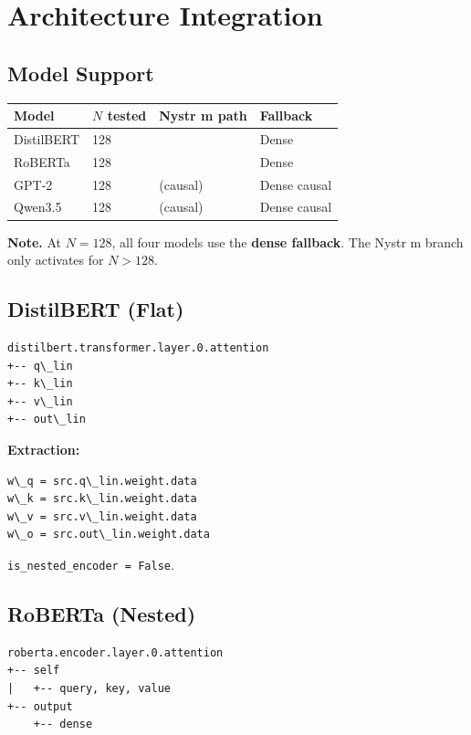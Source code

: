 
\section{Architecture Integration}

\subsection{Model Support}

\begin{table}[H]
\centering
\small
\begin{tabular}{llll}
\toprule
\textbf{Model} & \textbf{$N$ tested} & \textbf{Nystr m path} & \textbf{Fallback} \\
\midrule
DistilBERT & 128 &  & Dense \\
RoBERTa & 128 &  & Dense \\
GPT-2 & 128 & (causal) & Dense causal \\
Qwen3.5 & 128 & (causal) & Dense causal \\
\bottomrule
\end{tabular}
\end{table}

\textbf{Note.} At $N = 128$, all four models use the \textbf{dense fallback}. The 
Nystr m branch only activates for $N > 128$.

\subsection{DistilBERT (Flat)}

\begin{lstlisting}
distilbert.transformer.layer.0.attention
+-- q\_lin
+-- k\_lin
+-- v\_lin
+-- out\_lin
\end{lstlisting}

\textbf{Extraction:}
\begin{lstlisting}
w\_q = src.q\_lin.weight.data
w\_k = src.k\_lin.weight.data
w\_v = src.v\_lin.weight.data
w\_o = src.out\_lin.weight.data
\end{lstlisting}

\texttt{is\_nested\_encoder = False}.

\subsection{RoBERTa (Nested)}

\begin{lstlisting}
roberta.encoder.layer.0.attention
+-- self
|   +-- query, key, value
+-- output
    +-- dense
\end{lstlisting}

